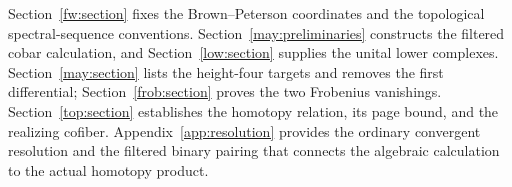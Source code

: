 Section~\ref{fw:section} fixes the Brown--Peterson coordinates and
the topological spectral-sequence conventions.
Section~\ref{may:preliminaries} constructs the filtered cobar calculation,
and Section~\ref{low:section} supplies the unital lower complexes.
Section~\ref{may:section} lists the height-four targets and removes the
first differential; Section~\ref{frob:section} proves the two Frobenius
vanishings. Section~\ref{top:section} establishes the homotopy relation,
its page bound, and the realizing cofiber. Appendix~\ref{app:resolution}
provides the ordinary convergent resolution and the filtered binary
pairing that connects the algebraic calculation to the actual
homotopy product.
